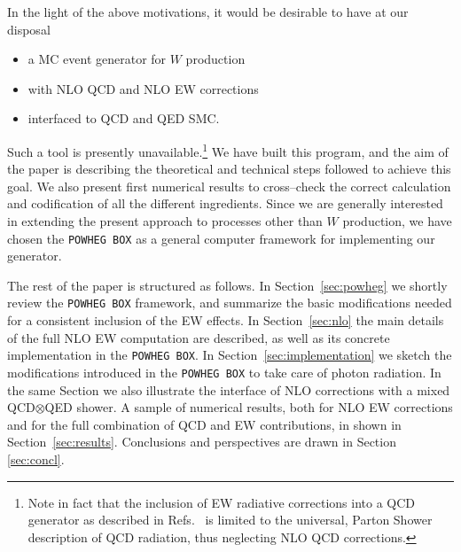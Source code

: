 \documentclass[11pt,a4paper]{article}
\newcommand\POWHEGBOX{\texttt{POWHEG BOX}}
\begin{document}
In the light of the above motivations,  it would be desirable to have at our 
disposal
\begin{itemize}
	\item a MC event generator for $W$ production
	\item with NLO QCD and NLO EW corrections
	\item interfaced to QCD and QED SMC.
\end{itemize}
Such a tool is presently unavailable.\footnote{Note in fact that the 
inclusion of EW radiative corrections into a QCD generator as described in 
Refs.~\cite{Richardson:2010gz,Yost:2012mf} 
is limited to the universal, Parton Shower description of QCD radiation, thus neglecting 
NLO QCD corrections.} We have built this program, and the 
aim of the paper is describing the theoretical and technical steps followed to achieve this goal. 
We also present first numerical results to cross--check the correct calculation and codification of
all the different ingredients. Since we are generally interested in 
extending the
present approach to processes other than $W$ production, we have chosen the 
 \POWHEGBOX{} as a general computer framework for implementing our generator.

The rest of the paper is structured as follows. In Section~\ref{sec:powheg} we
shortly review the \POWHEGBOX{} framework, 
and summarize the basic modifications needed for a
consistent inclusion of the EW effects.
In Section~\ref{sec:nlo} the main details of the full NLO EW computation 
are described, as well as its concrete implementation in the \POWHEGBOX{}. 
In Section~\ref{sec:implementation} we sketch the modifications introduced 
in the \POWHEGBOX{} to take care of photon
radiation. In the same Section we also illustrate the interface 
of NLO corrections with a mixed QCD$\otimes$QED shower. 
A sample of numerical results, both for NLO EW corrections and for the full 
combination of QCD and EW contributions, in shown in Section~\ref{sec:results}. 
Conclusions and perspectives are drawn in Section \ref{sec:concl}.
\end{document}
